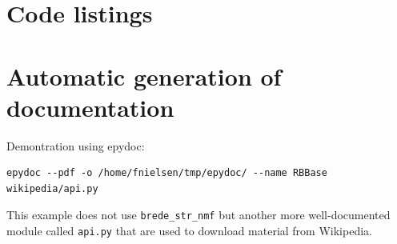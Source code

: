 \documentclass[10pt]{IEEEtran}
\begin{document}




\clearpage
\onecolumn
\appendices
\section{Code listings}

\lstlistoflistings

\label{listing:PBA}

\label{listing:Untappd}

\label{listing:keywordExtractor}

\label{listing:keywordClassifier}

\label{listing:dataPoints}

\label{listing:PBAMap}

\label{listing:labels}

\label{listing:fileReader}

\label{listing:dataQuantity}


\newpage
\section{Automatic generation of documentation}

Demontration using epydoc:
\begin{verbatim}
epydoc --pdf -o /home/fnielsen/tmp/epydoc/ --name RBBase wikipedia/api.py
\end{verbatim}
This example does not use \verb!brede_str_nmf! but another more
well-documented module called {\tt api.py} that are used to download
material from Wikipedia. 

%
\end{document}
